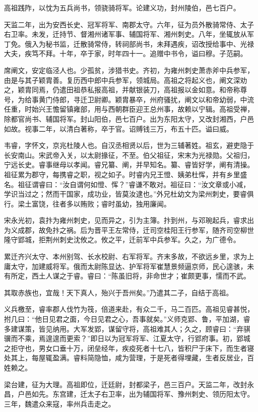 \documentclass[12pt,UTF8]{ctexbook}
\begin{document}
高祖践阼，以忱为五兵尚书，领骁骑将军。论建义功，封州陵伯，邑七百户。

天监二年，出为安西长史、冠军将军、南郡太守。六年，征为员外散骑常侍、太子右卫率。未发，迁持节、督湘州诸军事、辅国将军、湘州刺史。八年，坐辄放从军丁免。俄入为秘书监，迁散骑常侍，转祠部尚书，未拜遇疾，诏改授给事中、光禄大夫，疾笃不拜。十年，卒于家，时年四十一。追赠中书令，谥曰穆。子范嗣。

席阐文，安定临泾人也。少孤贫，涉猎书史。齐初，为雍州刺史萧赤斧中兵参军，由是与其子颖胄善。复历西中郎中兵参军，领城局。高祖之将起义也，阐文深劝之，颖胄同焉，仍遣田祖恭私报高祖，并献银装刀，高祖报以金如意。和帝称尊号，为给事黄门侍郎，寻迁卫尉卿。颖胄暴卒，州府骚扰，阐文以和帝幼弱，中流任重，时始兴王憺留镇雍部，用与西朝群臣迎王总州事，故赖以宁辑。高祖受禅，除都官尚书、辅国将军。封山阳伯，邑七百户。出为东阳太守，又改封湘西，户邑如故。视事二年，以清白著称，卒于官。诏赙钱三万，布五十匹。谥曰威。

韦睿，字怀文，京兆杜陵人也。自汉丞相贤以后，世为三辅著姓。祖玄，避吏隐于长安南山。宋武帝入关，以太尉掾征，不至。伯父祖征，宋末为光禄勋。父祖归，宁远长史。睿事继母以孝闻。睿兄纂、阐，并早知名。纂、睿皆好学，阐有清操。祖征累为郡守，每携睿之职，视之如子。时睿内兄王憕、姨弟杜恽，并有乡里盛名。祖征谓睿曰：“汝自谓何如憕、恽？”睿谦不敢对。祖征曰：“汝文章或小减，学识当过之；然而干国家，成功业，皆莫汝逮也。”外兄杜幼文为梁州刺史，要睿俱行。梁土富饶，往者多以贿败；睿时虽幼，独用廉闻。

宋永光初，袁抃为雍州刺史，见而异之，引为主簿。抃到州，与邓琬起兵，睿求出为义成郡，故免抃之祸。后为晋平王左常侍，迁司空桂阳王行参军，随齐司空柳世隆守郢城，拒荆州刺史沈攸之。攸之平，迁前军中兵参军。久之，为广德令。

累迁齐兴太守、本州别驾、长水校尉、右军将军。齐末多故，不欲远乡里，求为上庸太守，加建威将军。俄而太尉陈显达、护军将军崔慧景频逼京师，民心遑骇，未有所定，西土人谋之于睿。睿曰：“陈虽旧将，非命世才；崔颇更事，懦而不武。

其取赤族也，宜哉！天下真人，殆兴于吾州矣。”乃遣其二子，自结于高祖。

义兵檄至，睿率郡人伐竹为筏，倍道来赴，有众二千，马二百匹。高祖见睿甚悦，拊几曰：“他日见君之面，今日见君之心，吾事就矣。”义师克郢、鲁，平加湖，睿多建谋策，皆见纳用。大军发郢，谋留守将，高祖难其人；久之，顾睿曰：“弃骐骥而不乘，焉遑遑而更索？”即日以为冠军将军、江夏太守，行郢府事。初，郢城之拒守也，男女口垂十万，闭垒经年，疾疫死者十七八，皆积尸于床下，而生者寝处其上，每屋辄盈满。睿料简隐恤，咸为营理，于是死者得埋藏，生者反居业，百姓赖之。

梁台建，征为大理。高祖即位，迁廷尉，封都梁子，邑三百户。天监二年，改封永昌，户邑如先。东宫建，迁太子右卫率，出为辅国将军、豫州刺史、领历阳太守。三年，魏遣众来寇，率州兵击走之。
\end{document}
